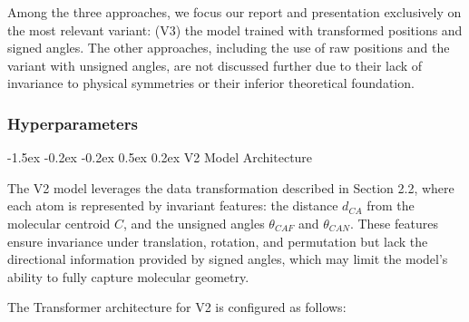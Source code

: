 \documentclass{article}
\makeatletter
\newcounter{subsubsubsection}[subsubsection]
\newcommand\subsubsubsection{\@startsection{subsubsubsection}{4}{\z@}%
    {-1.5ex \@plus -0.2ex \@minus -0.2ex}%
    {0.5ex \@plus 0.2ex}%
    {\normalfont\normalsize\bfseries}}%
\makeatother
\begin{document}
Among the three approaches, we focus our report and presentation exclusively on the most relevant variant: (V3) the model trained with transformed positions and signed angles. The other approaches, including the use of raw positions and the variant with unsigned angles, are not discussed further due to their lack of invariance to physical symmetries or their inferior theoretical foundation.


\subsubsection{Hyperparameters}

\subsubsubsection{V2 Model Architecture}


The V2 model leverages the data transformation described in Section 2.2, where each atom is represented by invariant features: the distance \( d_{CA} \) from the molecular centroid \( C \), and the unsigned angles \( \theta_{CAF} \) and \( \theta_{CAN} \). These features ensure invariance under translation, rotation, and permutation but lack the directional information provided by signed angles, which may limit the model’s ability to fully capture molecular geometry.

The Transformer architecture for V2 is configured as follows:
\end{document}
